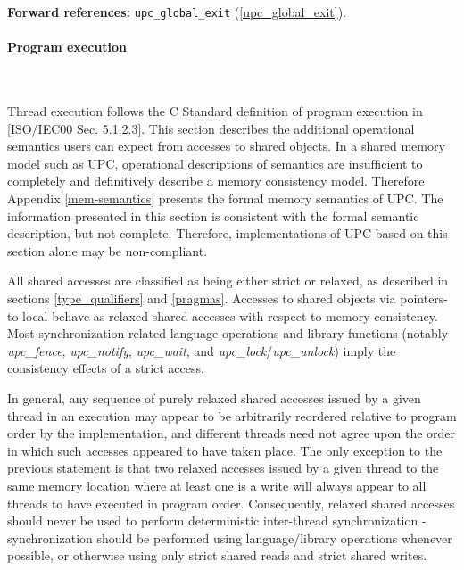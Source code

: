 \documentclass[12pt,titlepage]{article}
\newcounter{parnum}
\newcommand{\tab}{\textt{~~~~~~}}
\newcommand{\np}{
  \addtocounter{parnum}{1}
  \latex{\hspace{-2em}\makebox[2em][l]{\arabic{parnum}}}
  \html{{\bf {\arabic{parnum}}}\tab}}
\newcommand{\npf}{\setcounter{parnum}{0}\np}
\begin{document}
     {\bf Forward references:} {\tt upc\_global\_exit} (\ref{upc_global_exit}).  

\paragraph{Program execution}\ \\
\label{strict_relaxed}

\npf Thread execution follows the C Standard definition of
  program execution in [ISO/IEC00 Sec. 5.1.2.3].  This section describes
  the additional operational semantics users can expect from accesses to shared
  objects.  In a shared memory model such as UPC, operational
  descriptions of semantics are insufficient to completely
  and definitively describe a memory consistency model.  Therefore
  Appendix \ref{mem-semantics} presents the formal memory
  semantics of UPC.  The information presented in this section is consistent with
  the formal semantic description, but not complete.  Therefore, implementations
  of UPC based on this section alone may be non-compliant.
  
\np All shared accesses are classified as being either strict or relaxed,
  as described in sections \ref{type_qualifiers} and \ref{pragmas}.
  Accesses to shared objects via
  pointers-to-local behave as relaxed shared accesses with respect to memory
  consistency. Most synchronization-related language operations and library
  functions (notably {\it upc\_fence}, {\it upc\_notify}, {\it upc\_wait}, and
  {\it upc\_lock}/{\it upc\_unlock}) imply the consistency effects of a strict
  access.

\np In general, any sequence of purely relaxed shared accesses
  issued by a given
  thread in an execution may appear to be arbitrarily reordered relative to
  program order by the implementation, and different threads need not agree upon
  the order in which such accesses appeared to have taken place. The only
  exception to the previous statement is that two relaxed accesses issued by a
  given thread to the same memory location where at least one is a write will
  always appear to all threads to have executed in program order. Consequently,
  relaxed shared accesses should never be used to perform deterministic
  inter-thread synchronization - synchronization should be performed using
  language/library operations whenever possible, or otherwise using only strict
  shared reads and strict shared writes.
\end{document}
